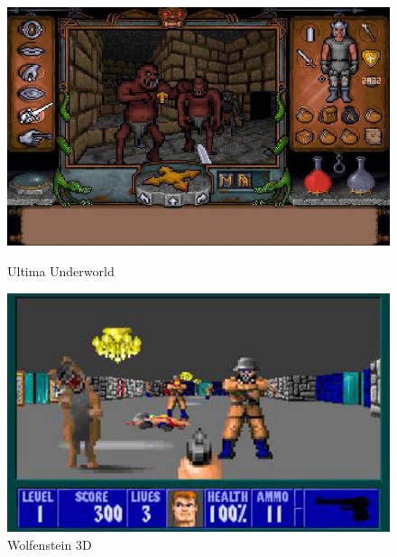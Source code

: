 \documentclass[12pt]{report}
\begin{document}
\begin{figure}
	\begin{minipage}{0.48\textwidth}
		\includegraphics[width=\linewidth]{image/Ultima_Underworld.jpg}
		\hspace*{-0.5cm}
		\caption{Ultima Underworld}
		\label{fig:ultimaunderworld}
	\end{minipage}
	\begin{minipage}{0.48\textwidth}
		\includegraphics[width=\linewidth]{image/wolfenstein_3d.jpg}
		\hspace*{-0.5cm}
		\caption{Wolfenstein 3D}
		\label{fig:wolfenstein3d}
	\end{minipage}
\end{figure}
\end{document}

